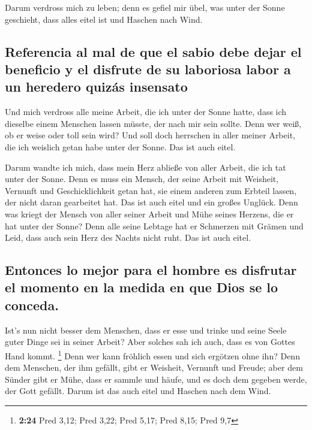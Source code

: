  Darum verdross mich zu leben; denn es gefiel mir übel,
was unter der Sonne geschieht, dass alles eitel ist und Haschen nach
Wind.

\hypertarget{referencia-al-mal-de-que-el-sabio-debe-dejar-el-beneficio-y-el-disfrute-de-su-laboriosa-labor-a-un-heredero-quizuxe1s-insensato}{%
\subsection{Referencia al mal de que el sabio debe dejar el beneficio y
el disfrute de su laboriosa labor a un heredero quizás
insensato}\label{referencia-al-mal-de-que-el-sabio-debe-dejar-el-beneficio-y-el-disfrute-de-su-laboriosa-labor-a-un-heredero-quizuxe1s-insensato}}

 Und mich verdross alle meine Arbeit, die ich unter der
Sonne hatte, dass ich dieselbe einem Menschen lassen müsste, der nach
mir sein sollte.  Denn wer weiß, ob er weise oder toll
sein wird? Und soll doch herrschen in aller meiner Arbeit, die ich
weislich getan habe unter der Sonne. Das ist auch eitel.

 Darum wandte ich mich, dass mein Herz abließe von aller
Arbeit, die ich tat unter der Sonne.  Denn es muss ein
Mensch, der seine Arbeit mit Weisheit, Vernunft und Geschicklichkeit
getan hat, sie einem anderen zum Erbteil lassen, der nicht daran
gearbeitet hat. Das ist auch eitel und ein großes Unglück.
 Denn was kriegt der Mensch von aller seiner Arbeit und
Mühe seines Herzens, die er hat unter der Sonne?  Denn
alle seine Lebtage hat er Schmerzen mit Grämen und Leid, dass auch sein
Herz des Nachts nicht ruht. Das ist auch eitel.

\hypertarget{entonces-lo-mejor-para-el-hombre-es-disfrutar-el-momento-en-la-medida-en-que-dios-se-lo-conceda.}{%
\subsection{Entonces lo mejor para el hombre es disfrutar el momento en
la medida en que Dios se lo
conceda.}\label{entonces-lo-mejor-para-el-hombre-es-disfrutar-el-momento-en-la-medida-en-que-dios-se-lo-conceda.}}

 Ist's nun nicht besser dem Menschen, dass er esse und
trinke und seine Seele guter Dinge sei in seiner Arbeit? Aber solches
sah ich auch, dass es von Gottes Hand kommt. \footnote{\textbf{2:24}
  Pred 3,12; Pred 3,22; Pred 5,17; Pred 8,15; Pred 9,7} 
Denn wer kann fröhlich essen und sich ergötzen ohne ihn? 
Denn dem Menschen, der ihm gefällt, gibt er Weisheit, Vernunft und
Freude; aber dem Sünder gibt er Mühe, dass er sammle und häufe, und es
doch dem gegeben werde, der Gott gefällt. Darum ist das auch eitel und
Haschen nach dem Wind.

